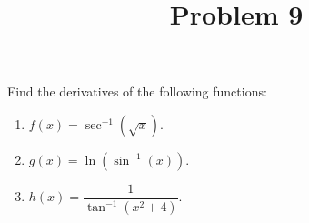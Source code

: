 \documentclass{ximera}
\title[Problem 9]{Problem 9}
\begin{document}
\begin{abstract} \end{abstract}
\maketitle

\begin{problem}
Find the derivatives of the following functions:
	\begin{enumerate}
	
	\item  $f(x) = \sec^{-1} (\sqrt{x})$.
	\item  $g(x) = \ln (\sin^{-1}(x))$.
	\item  $h(x) = \dfrac{1}{\tan^{-1}(x^2 + 4)}$.  
\end{enumerate}
		
\end{problem}
\end{document}
